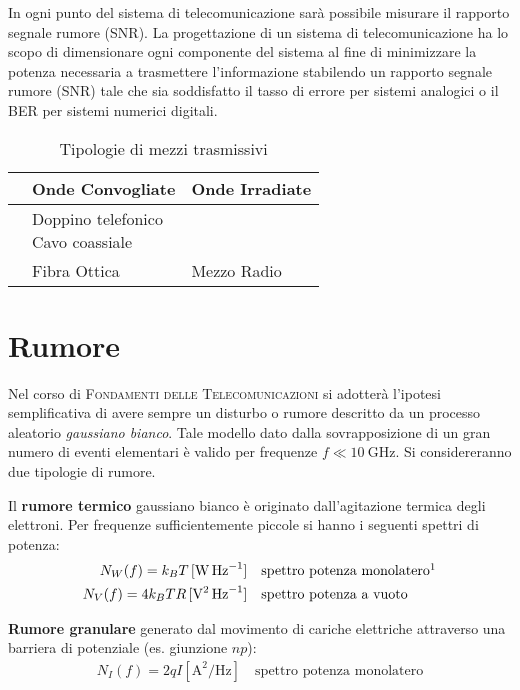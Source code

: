 In ogni punto del sistema di telecomunicazione sarà possibile misurare il rapporto segnale rumore (\ac{SNR}). La progettazione di un sistema di telecomunicazione ha lo scopo di dimensionare ogni componente del sistema al fine di minimizzare la potenza necessaria a trasmettere l'informazione stabilendo un rapporto segnale rumore (\ac{SNR}) tale che sia soddisfatto il tasso di errore per sistemi analogici o il \ac{BER} per sistemi numerici digitali.

\begin{table}[!ht]\centering
	\begin{tabular}{c|p{}|p{}}
		\hline \rule[-2ex]{0pt}{5.5ex}  & Onde Convogliate & Onde Irradiate \\ 
		\hline \rule[-2ex]{0pt}{5.5ex} \keyword{LP} & \parbox[c]{5cm}{Doppino telefonico\\ Cavo coassiale} &  \\ 
		\hline \rule[-2ex]{0pt}{5.5ex}  & Fibra Ottica & Mezzo Radio \\ 
		\hline 
	\end{tabular} 
	\caption{Tipologie di mezzi trasmissivi}\label{tab:mezzi-trasmissivi}
\end{table}

\section{Rumore}
Nel corso di \textsc{Fondamenti delle Telecomunicazioni} si adotterà l'ipotesi semplificativa di avere sempre un disturbo o rumore descritto da un processo aleatorio \emph{gaussiano bianco}. Tale modello dato dalla sovrapposizione di un gran numero di eventi elementari è valido per frequenze $f\ll\SI{10}{\giga\hertz}$. Si considereranno due tipologie di rumore.

\begin{definizione}
Il \textbf{rumore termico} gaussiano bianco è originato dall'agitazione termica degli elettroni. Per frequenze sufficientemente piccole si hanno i seguenti spettri di potenza:
\begin{equation}\begin{split}
N_W(f)=k_B T \,[\si{\watt\per\hertz}] &\quad \text{spettro potenza monolatero}\footnotemark\\
N_V(f)=4 k_B T R \,[\si{\volt\squared\per\hertz}] &\quad \text{spettro potenza a vuoto}
\end{split}\end{equation}
\end{definizione}
\begin{definizione}
\textbf{Rumore granulare} generato dal movimento di cariche elettriche attraverso una barriera di potenziale (es. giunzione $np$):
\begin{equation}\begin{split} N_I(f)= 2 q I [\si{\ampere\squared\per\hertz}]\quad\text{spettro potenza monolatero} \end{split}\end{equation}
\end{definizione}

